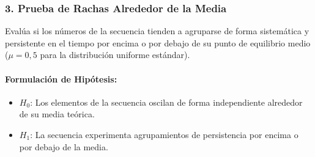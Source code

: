 \documentclass{article}
\begin{document}
\subsubsection{3. Prueba de Rachas Alrededor de la Media}
Evalúa si los números de la secuencia tienden a agruparse de forma sistemática y persistente en el tiempo por encima o por debajo de su punto de equilibrio medio ($\mu = 0,5$ para la distribución uniforme estándar).

\paragraph{Formulación de Hipótesis:}
\begin{itemize}
    \item $H_0$: Los elementos de la secuencia oscilan de forma independiente alrededor de su media teórica.
    \item $H_1$: La secuencia experimenta agrupamientos de persistencia por encima o por debajo de la media.
\end{itemize}
\end{document}
